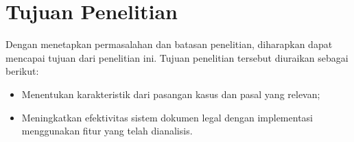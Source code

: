 \section{Tujuan Penelitian}
\label{subbab:1:Tujuan Penelitian}
Dengan menetapkan permasalahan dan batasan penelitian, diharapkan dapat mencapai tujuan dari penelitian ini. Tujuan penelitian tersebut diuraikan sebagai berikut:
\begin{itemize} [topsep=0pt, itemsep=-1ex, partopsep=1ex, parsep=1ex]
    \item Menentukan karakteristik dari pasangan kasus dan pasal yang relevan;
    \item Meningkatkan efektivitas sistem \ir{} dokumen legal dengan implementasi \reranker{} menggunakan fitur yang telah dianalisis.
\end{itemize}





